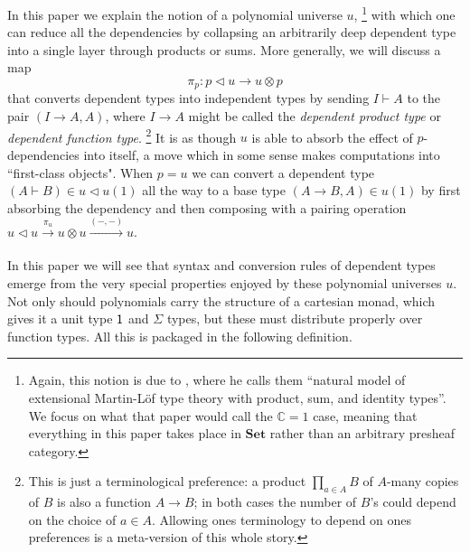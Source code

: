 \documentclass[11pt, one side, article]{memoir}
\theoremstyle{definition}
\theoremstyle{plain}
\newcommand{\Cat}[1]{\mathbf{#1}}%
\newcommand{\To}[2][]{\xrightarrow[#1]{#2}}
\newcommand{\smset}{\Cat{Set}}
\newcommand{\0}{\textsf{0}}
\newcommand{\1}{\tn{\textsf{1}}}
\newcommand{\tri}{\mathbin{\triangleleft}}
\newcommand{\switch}{\pi}
\begin{document}
In this paper we explain the notion of a polynomial universe $u$,%
\footnote{Again, this notion is due to \cite[Theorem 16]{awodey2014natural}, where he calls them ``natural model of extensional Martin-L\"{o}f type theory with
product, sum, and identity types''. We focus on what that paper would call the $\mathbb{C}=1$ case, meaning that everything in this paper takes place in $\smset$ rather than an arbitrary presheaf category.}
with which one can reduce all the dependencies by collapsing an arbitrarily deep dependent type into a single layer through products or sums. More generally, we will discuss a map
\begin{equation}\label{eqn.switch}
  \switch_p\colon p\tri u\to u\otimes p
\end{equation}
that converts dependent types into independent types by sending $I\vdash A$ to the pair $(I\to A,A)$, where $I\to A$ might be called the \emph{dependent product type} or \emph{dependent function type}.%
\footnote{This is just a terminological preference: a product $\prod_{a\in A}B$ of $A$-many copies of $B$ is also a function $A\to B$; in both cases the number of $B$'s could depend on the choice of $a\in A$. Allowing ones terminology to depend on ones preferences is a meta-version of this whole story.}
It is as though $u$ is able to absorb the effect of $p$-dependencies into itself, a move which in some sense makes computations into ``first-class objects". When $p=u$ we can convert a dependent type $(A\vdash B)\in u\tri u(1)$ all the way to a base type $(A\to B,A)\in u(1)$ by first absorbing the dependency and then composing with a pairing operation $u\tri u\To{\switch_u} u\otimes u\To{(-,-)} u$.

In this paper we will see that syntax and conversion rules of dependent types  emerge from the very special properties enjoyed by these polynomial universes $u$. Not only should polynomials carry the structure of a cartesian monad, which gives it a unit type $\1$ and $\Sigma$ types, but these must distribute properly over function types. All this is packaged in the following definition.
\end{document}
